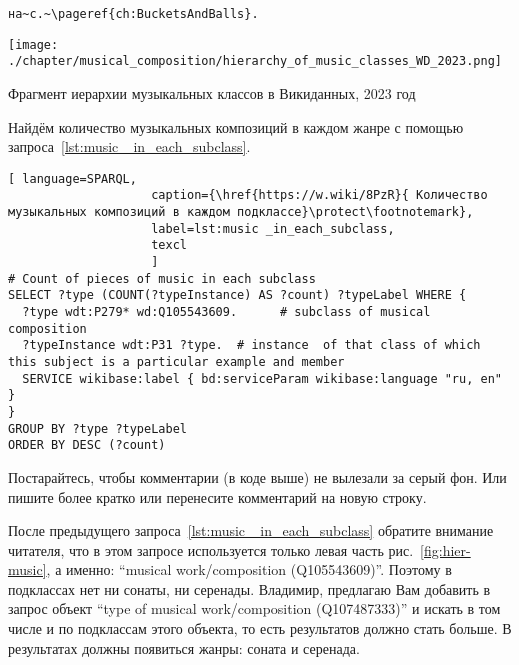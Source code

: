 \begin{verbatim}
на~с.~\pageref{ch:BucketsAndBalls}. 
\end{verbatim}


\begin{marginfigure}[0\baselineskip]
	\texttt{[image: ./chapter/musical\_composition/hierarchy\_of\_music\_classes\_WD\_2023.png]}
	\caption[Иерархия музыкальных классов]{Фрагмент иерархии музыкальных классов в Викиданных, 2023 год}%
	\label{fig:hier-music}%
\end{marginfigure}
Найдём количество музыкальных композиций в каждом жанре с помощью запроса~\ref{lst:music _in_each_subclass}.

\begin{lstlisting}[ language=SPARQL,
                    caption={\href{https://w.wiki/8PzR}{ Количество музыкальных композиций в каждом подклассе}\protect\footnotemark},
                    label=lst:music _in_each_subclass,
                    texcl
                    ]
# Count of pieces of music in each subclass
SELECT ?type (COUNT(?typeInstance) AS ?count) ?typeLabel WHERE {
  ?type wdt:P279* wd:Q105543609.      # subclass of musical composition
  ?typeInstance wdt:P31 ?type.  # instance  of that class of which this subject is a particular example and member
  SERVICE wikibase:label { bd:serviceParam wikibase:language "ru, en" }
}
GROUP BY ?type ?typeLabel
ORDER BY DESC (?count)
\end{lstlisting}%

\TODO Постарайтесь, чтобы комментарии (в коде выше) не вылезали за серый фон. 
Или пишите более кратко или перенесите комментарий на новую строку.

\TODO После предыдущего запроса~\ref{lst:music _in_each_subclass} 
обратите внимание читателя, 
что в этом запросе используется только левая часть рис.~\ref{fig:hier-music}, 
а именно:  ``musical work/composition (Q105543609)''. 
Поэтому в подклассах нет ни сонаты, ни серенады. 
Владимир, предлагаю Вам добавить в запрос объект ``type of musical work/composition (Q107487333)'' 
и искать в том числе и по подклассам этого объекта, то есть результатов должно стать больше. 
В результатах должны появиться жанры: соната и серенада.


